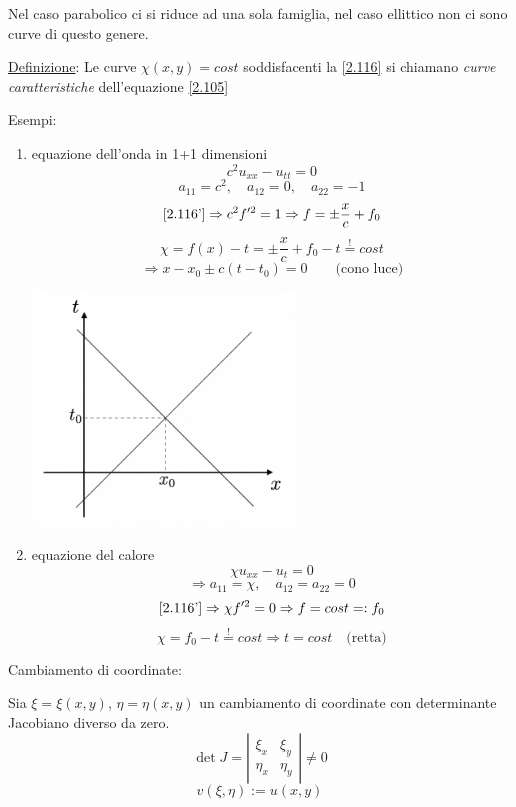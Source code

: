 \documentclass[a4paper,11pt]{report}
\begin{document}
Nel caso parabolico ci si riduce ad una sola famiglia, nel caso ellittico non ci sono curve di questo genere.

\smallskip

\underline{Definizione}: Le curve $\chi(x,y)=cost$ soddisfacenti la \eqref{2.116} si chiamano \emph{curve caratteristiche} dell'equazione \eqref{2.105}

\medskip

Esempi:
\begin{enumerate}[label=(\roman*)]
\item equazione dell'onda in 1+1 dimensioni
\[
c^2 u_{xx}-u_{tt}=0
\]
\[
a_{11}=c^2, \quad a_{12}=0, \quad a_{22}=-1
\]
\[
\eqref{2.116'}\Rightarrow c^2f'^2 =1 \Rightarrow f=\pm \frac{x}{c} + f_0
\]
\[
\chi=f(x) - t= \pm \frac{x}{c}+f_0 -t \overset{!}{=}cost
\]
\[
\Rightarrow x-x_0 \pm c(t-t_0)=0 \qquad \text{(cono luce)}
\]
\begin{center}
\includegraphics[width=0.55\textwidth]{immagini/conoluce}
\end{center}
\item equazione del calore 
\[
\chi u_{xx}- u_t=0
\]
\[
\Rightarrow a_{11}=\chi, \quad a_{12}=a_{22}=0
\]
\[
\eqref{2.116'} \Rightarrow \chi f'^2 =0 \Rightarrow f=cost=:f_0
\]
\[
\chi = f_0-t \overset{!}{=} cost \Rightarrow t = cost \quad \text{(retta)}
\]
\end{enumerate}

\medskip

Cambiamento di coordinate:

Sia $\xi=\xi(x,y)$, $\eta=\eta(x,y)$ un cambiamento di coordinate con determinante Jacobiano diverso da zero.
\[
\det J=\left| \begin{matrix} \xi_x &\xi_y \\ \eta_x & \eta_y \end{matrix} \right| \neq 0
\]
\[
v(\xi,\eta):=u(x,y)
\]
\end{document}
